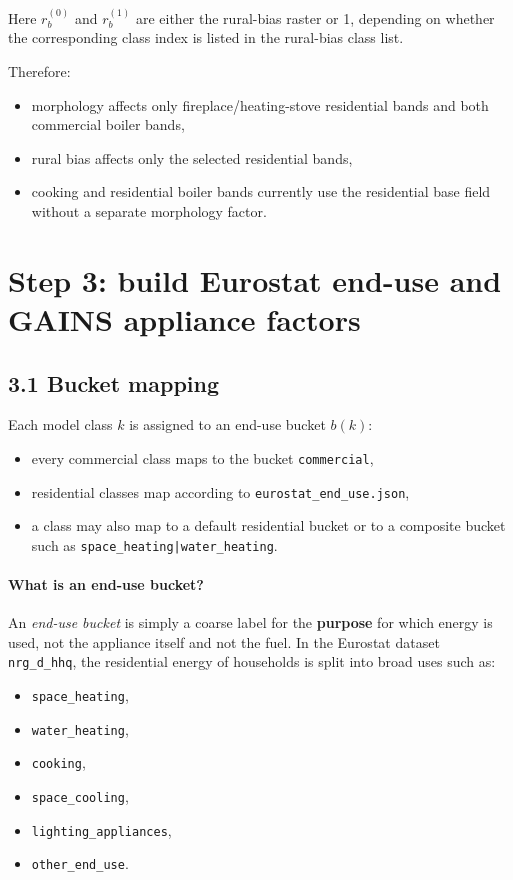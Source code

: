 \documentclass[11pt,a4paper]{article}
\begin{document}
Here $r_b^{(0)}$ and $r_b^{(1)}$ are either the rural-bias raster or 1, depending
on whether the corresponding class index is listed in the rural-bias class list.

Therefore:

\begin{itemize}[leftmargin=1.4em]
  \item morphology affects only fireplace/heating-stove residential bands and both commercial boiler bands,
  \item rural bias affects only the selected residential bands,
  \item cooking and residential boiler bands currently use the residential base
  field without a separate morphology factor.
\end{itemize}

\section{Step 3: build Eurostat end-use and GAINS appliance factors}

\subsection{3.1 Bucket mapping}

Each model class $k$ is assigned to an end-use bucket $b(k)$:

\begin{itemize}[leftmargin=1.4em]
  \item every commercial class maps to the bucket \texttt{commercial},
  \item residential classes map according to \texttt{eurostat\_end\_use.json},
  \item a class may also map to a default residential bucket or to a composite
  bucket such as \texttt{space\_heating|water\_heating}.
\end{itemize}

\paragraph{What is an end-use bucket?}
An \emph{end-use bucket} is simply a coarse label for the \textbf{purpose} for which
energy is used, not the appliance itself and not the fuel. In the Eurostat dataset
\texttt{nrg\_d\_hhq}, the residential energy of households is split into broad uses such as:

\begin{itemize}[leftmargin=1.4em]
  \item \texttt{space\_heating},
  \item \texttt{water\_heating},
  \item \texttt{cooking},
  \item \texttt{space\_cooling},
  \item \texttt{lighting\_appliances},
  \item \texttt{other\_end\_use}.
\end{itemize}
\end{document}
